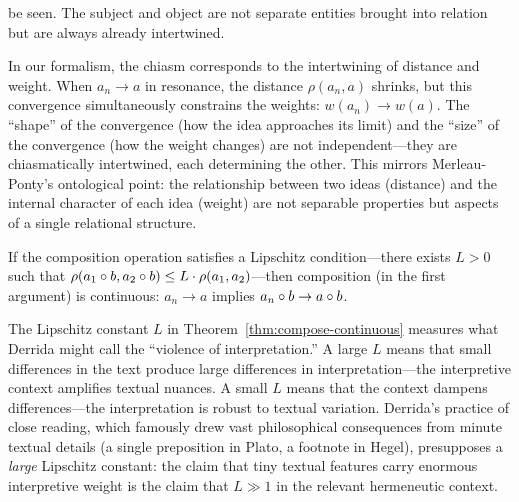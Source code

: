 \begin{interpretation}
be seen.  The subject and object are not separate entities brought into
relation but are always already intertwined.

In our formalism, the chiasm corresponds to the intertwining of
distance and weight.  When $a_n \to a$ in resonance, the distance
$\rho(a_n, a)$ shrinks, but this convergence simultaneously constrains
the weights: $w(a_n) \to w(a)$.  The ``shape'' of the convergence (how
the idea approaches its limit) and the ``size'' of the convergence (how
the weight changes) are not independent---they are chiasmatically
intertwined, each determining the other.  This mirrors Merleau-Ponty's
ontological point: the relationship between two ideas (distance) and the
internal character of each idea (weight) are not separable properties but
aspects of a single relational structure.
\end{interpretation}



\begin{theorem}
\label{thm:compose-continuous}
If the composition operation satisfies a Lipschitz condition---there exists
$L > 0$ such that $\rho(a_1 \circ b, a_2 \circ b) \leq L \cdot \rho(a_1, a_2)$---then composition (in the first argument) is continuous:
$a_n \to a$ implies $a_n \circ b \to a \circ b$.
\end{theorem}

\begin{remark}
\label{rem:ch11:lipschitz_derrida}
The Lipschitz constant $L$ in Theorem~\ref{thm:compose-continuous} measures
what Derrida might call the ``violence of interpretation.''  A large $L$
means that small differences in the text produce large differences in
interpretation---the interpretive context amplifies textual nuances.  A
small $L$ means that the context dampens differences---the interpretation is
robust to textual variation.  Derrida's practice of close reading, which
famously drew vast philosophical consequences from minute textual details
(a single preposition in Plato, a footnote in Hegel), presupposes a
\emph{large} Lipschitz constant: the claim that tiny textual features carry
enormous interpretive weight is the claim that $L \gg 1$ in the relevant
hermeneutic context.
\end{remark}




